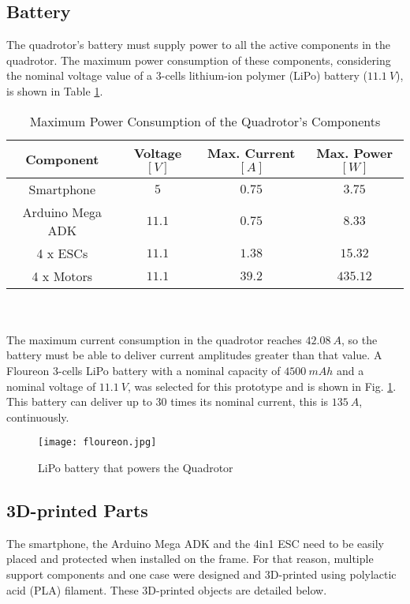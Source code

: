 \subsection{Battery}
The quadrotor's battery must supply power to all the active components in the quadrotor. The maximum power consumption of these components, considering the nominal voltage value of a 3-cells lithium-ion polymer (LiPo) battery ($11.1\ V$), is shown in Table \ref{tb:power}.\\
\begin{table}[h]
\small
\begin{center}
\caption{Maximum Power Consumption of the Quadrotor's Components}\label{tb:power}
\begin{tabular}{c|c|c|c}\hline
\rule{0pt}{3ex} Component & Voltage $[V]$ & Max. Current $[A]$ & Max. Power $[W]$ \\\hline\hline
\rule{0pt}{3ex}
Smartphone &  $5$ & $0.75$ & $3.75$ \\[0.4ex]
Arduino Mega ADK & $11.1$ & $0.75$ & $8.33$ \\[0.4ex] 
4 x ESCs &  $11.1$ & $1.38$ & $15.32$ \\[0.4ex]
4 x Motors & $11.1$ & $39.2$ & $435.12$ \\[0.4ex]\hline
\end{tabular}
\end{center}
\end{table}
\vspace{-0.5cm}
\\\\The maximum current consumption in the quadrotor reaches $42.08\ A$, so the battery must be able to deliver current amplitudes greater than that value. A Floureon 3-cells LiPo battery with a nominal capacity of $4500\ mAh$ and a nominal voltage of $11.1\ V$, was selected for this prototype and is shown in Fig. \ref{fig:battery}. This battery can deliver up to $30$ times its nominal current, this is $135\ A$, continuously.
\begin{figure}[H]
	\begin{center}
		\texttt{[image: floureon.jpg]}    
		\caption[LiPo battery that powers the Quadrotor]{LiPo battery that powers the Quadrotor\protect\footnotemark} 
		\label{fig:battery}
	\end{center}
\end{figure}

\subsection{3D-printed Parts}
The smartphone, the Arduino Mega ADK and the 4in1 ESC need to be easily placed and protected when installed on the frame. For that reason, multiple support components and one case were designed and 3D-printed using polylactic acid (PLA) filament. These 3D-printed objects are detailed below.

